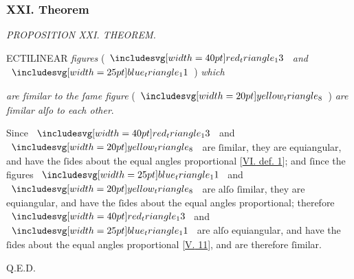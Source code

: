 \documentclass[11pt,preview]{standalone}
\begin{document}
\subsubsection{XXI. Theorem}

\begin{minipage}[t]{0.43\textwidth}
    \vspace{0pt}
    
\end{minipage}%
\hfill
\begin{minipage}[t]{0.54\textwidth}
    \begin{center}
        \textit{PROPOSITION XXI. THEOREM.}\label{book6pr21} \\
    \end{center}

    \hfill

    \begin{center}
        \raggedright \lettrine[lines=3, loversize=1, nindent=0pt]{}{}ECTILINEAR \textit{figures} (\hspace{-1ex}$\img[0][0][40]{red_triangle_13}$ \textit{and} $\img{blue_triangle_11}$\hspace{-1ex}) \textit{which}
    \end{center}
    \raggedright \textit{are ſimilar to the ſame figure} (\hspace{-1ex}$\img[0][0][20]{yellow_triangle_8}$\hspace{-1ex}) \textit{are ſimilar alſo to each other}.
\end{minipage}

\hfill

\hfill

\raggedright Since $\img[0][0][40]{red_triangle_13}$ and $\img[0][0][20]{yellow_triangle_8}$ are ſimilar, they are equiangular, and have the ſides about the equal angles proportional [\hyperref[book6def1]{\textsc{VI.} def. 1}]; and ſince the figures $\img{blue_triangle_11}$ and $\img[0][0][20]{yellow_triangle_8}$ are alſo ſimilar, they are equiangular, and have the ſides about the equal angles proportional; therefore $\img[0][0][40]{red_triangle_13}$ and $\img{blue_triangle_11}$ are alſo equiangular, and have the ſides about the equal angles proportional [\hyperref[book5pr11]{\textsc{V.} 11}], and are therefore ſimilar.

\hfill

\hfill Q.E.D.
\end{document}
